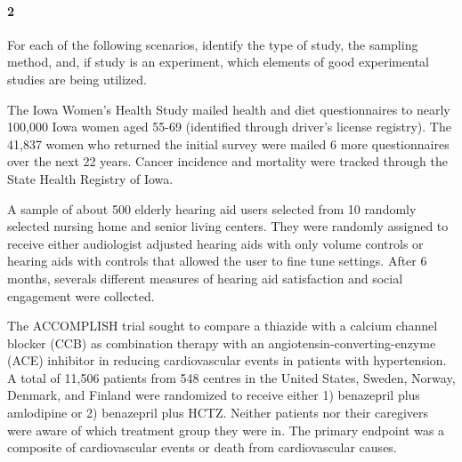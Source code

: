 \documentclass{article}
\begin{document}
\begin{flushleft}
\newpage
\paragraph{2} For each of the following scenarios, identify the type of study, the sampling method, and, if study is an experiment, which elements of good experimental studies are being utilized.

\begin{enumalpha}
\item The Iowa Women's Health Study mailed health and diet questionnaires to nearly 100,000 Iowa women aged 55-69 (identified through driver's license registry). The 41,837 women who returned the initial survey were mailed 6 more questionnaires over the next 22 years. Cancer incidence and mortality were tracked through the State Health Registry of Iowa.\\ \medskip
{}
\vspace{0.5in}

\item A sample of about 500 elderly hearing aid users selected from 10 randomly selected nursing home and senior living centers. They were randomly assigned to receive either audiologist adjusted hearing aids with only volume controls or hearing aids with controls that allowed the user to fine tune settings. After 6 months, severals different measures of hearing aid satisfaction and social engagement were collected.\\ \medskip
{}
\vspace{0.5in}

\item The ACCOMPLISH trial sought to compare a thiazide with a calcium channel blocker (CCB) as combination therapy with an angiotensin-converting-enzyme (ACE) inhibitor in reducing cardiovascular events in patients with hypertension. A total of 11,506 patients from 548 centres in the United States, Sweden, Norway, Denmark, and Finland were randomized to receive either 1) benazepril plus amlodipine or 2) benazepril plus HCTZ. Neither patients nor their caregivers were aware of which treatment group they were in. The primary endpoint was a composite of cardiovascular events or death from cardiovascular causes. \\ \medskip
{}
\vspace{0.5in}


\end{enumalpha}
\end{flushleft}
\end{document}
